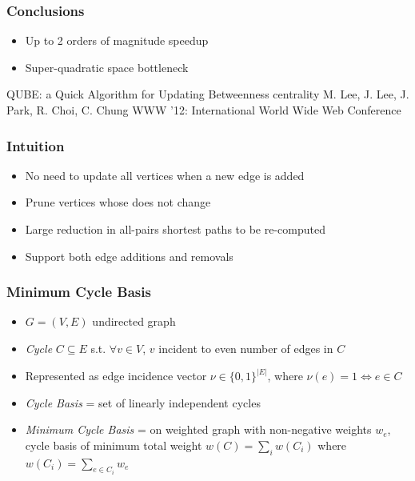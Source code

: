 \begin{frame}
  \frametitle{Conclusions}

  \begin{itemize}
    \item Up to 2 orders of magnitude speedup
    \item Super-quadratic space bottleneck
  \end{itemize}

\end{frame}


\begin{frame}
  \centering
  \vfill
  {\huge QUBE: a Quick Algorithm for Updating Betweenness centrality}
  \vfill
  {\Large M. Lee, J. Lee, J. Park, R. Choi, C. Chung}
  \vfill
  {\large WWW '12: International World Wide Web Conference}
  \vfill
\end{frame}

\begin{frame}
  \frametitle{Intuition}

  \begin{itemize}
    \item No need to update all vertices when a new edge is added
    \item Prune vertices whose \betw does not change
    \item Large reduction in all-pairs shortest paths to be re-computed
    \item Support both edge additions and removals
  \end{itemize}
\end{frame}


\begin{frame}
  \frametitle{Minimum Cycle Basis}

  \begin{itemize}
    \item $G=(V,E)$ undirected graph
    \item \emph{Cycle} $C \subseteq E$ s.t. $\forall v \in V$, $v$ incident to even number of edges in $C$
    \item Represented as edge incidence vector $\nu \in \{ 0,1 \}^{|E|}$, where $\nu(e) = 1 \iff e \in C$
    \item \emph{Cycle Basis} = set of linearly independent cycles
    \item \emph{Minimum Cycle Basis} = on weighted graph with non-negative weights $w_e$, cycle basis of minimum total weight $w(C) = \sum_{i} w(C_i)$ where $w(C_i) = \sum_{e \in C_i} w_e$
  \end{itemize}
\end{frame}


